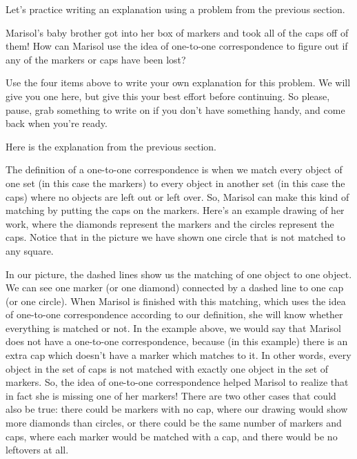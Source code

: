 \documentclass[noauthor,nooutcomes]{ximera}
\begin{document}
Let's practice writing an explanation using a problem from the previous section.



\begin{problem}
Marisol's baby brother got into her box of markers and took all of the caps off of them! How can Marisol  use the idea of one-to-one correspondence to figure out if any of the markers or caps have been lost?

\begin{prompt} %
Use the four items above to write your own explanation for this problem. We will give you one here, but give this your best effort before continuing. So please, pause, grab something to write on if you don't have something handy, and come back when you're ready.

\begin{multipleChoice}
\end{multipleChoice}
\end{prompt}



\begin{problem} Here is the explanation from the previous section.


The definition of a one-to-one correspondence is when we match every object of one set (in this case the markers) 
to every object in another set (in this case the caps) where no objects are left out or left over. So, Marisol can 
make this kind of matching by putting the caps on the markers. Here's an example drawing of her work, where the 
diamonds represent the markers and the circles represent the caps. Notice that in the picture we have shown one circle 
that is not matched to any square.
\begin{image}
\end{image}
In our picture, the dashed lines show us the matching of one object to one object. We can see one marker (or one diamond) 
connected by a dashed line to one cap (or one circle). When Marisol is finished with this matching, which uses the idea 
of one-to-one correspondence according to our definition, she will know whether everything is matched or not. In the 
example above, we would say that Marisol does not have a one-to-one correspondence, because (in this example) there is 
an extra cap which doesn't have a marker which matches to it. In other words, every object in the set of caps is not 
matched with exactly one object in the set of markers. So, the idea of one-to-one correspondence helped Marisol to 
realize that in fact she is missing one of her markers! There are two other cases that could also be true: there could 
be markers with no cap, where our drawing would show more diamonds than circles, or there could be the same number of markers and caps, where each marker would be matched with a cap, and there would be no leftovers at all.


\end{problem}
\end{problem}
\end{document}

